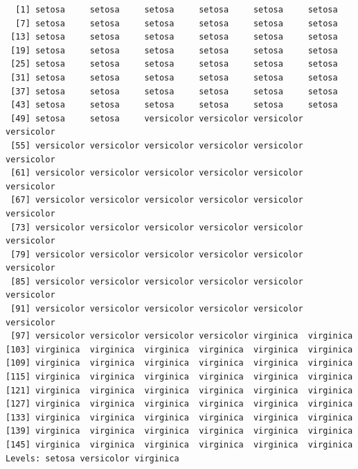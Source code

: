 \documentclass[
  letterpaper,
  DIV=11,
  numbers=noendperiod]{scrartcl}
\newenvironment{Shaded}{\begin{snugshade}}{\end{snugshade}}
\newcommand{\CommentTok}[1]{\textcolor[rgb]{0.37,0.37,0.37}{#1}}
\newcommand{\FunctionTok}[1]{\textcolor[rgb]{0.28,0.35,0.67}{#1}}
\newcommand{\NormalTok}[1]{\textcolor[rgb]{0.00,0.23,0.31}{#1}}
\newcommand{\OtherTok}[1]{\textcolor[rgb]{0.00,0.23,0.31}{#1}}
\newcommand{\SpecialCharTok}[1]{\textcolor[rgb]{0.37,0.37,0.37}{#1}}
\newcommand{\StringTok}[1]{\textcolor[rgb]{0.13,0.47,0.30}{#1}}
\begin{document}
\begin{verbatim}
  [1] setosa     setosa     setosa     setosa     setosa     setosa    
  [7] setosa     setosa     setosa     setosa     setosa     setosa    
 [13] setosa     setosa     setosa     setosa     setosa     setosa    
 [19] setosa     setosa     setosa     setosa     setosa     setosa    
 [25] setosa     setosa     setosa     setosa     setosa     setosa    
 [31] setosa     setosa     setosa     setosa     setosa     setosa    
 [37] setosa     setosa     setosa     setosa     setosa     setosa    
 [43] setosa     setosa     setosa     setosa     setosa     setosa    
 [49] setosa     setosa     versicolor versicolor versicolor versicolor
 [55] versicolor versicolor versicolor versicolor versicolor versicolor
 [61] versicolor versicolor versicolor versicolor versicolor versicolor
 [67] versicolor versicolor versicolor versicolor versicolor versicolor
 [73] versicolor versicolor versicolor versicolor versicolor versicolor
 [79] versicolor versicolor versicolor versicolor versicolor versicolor
 [85] versicolor versicolor versicolor versicolor versicolor versicolor
 [91] versicolor versicolor versicolor versicolor versicolor versicolor
 [97] versicolor versicolor versicolor versicolor virginica  virginica 
[103] virginica  virginica  virginica  virginica  virginica  virginica 
[109] virginica  virginica  virginica  virginica  virginica  virginica 
[115] virginica  virginica  virginica  virginica  virginica  virginica 
[121] virginica  virginica  virginica  virginica  virginica  virginica 
[127] virginica  virginica  virginica  virginica  virginica  virginica 
[133] virginica  virginica  virginica  virginica  virginica  virginica 
[139] virginica  virginica  virginica  virginica  virginica  virginica 
[145] virginica  virginica  virginica  virginica  virginica  virginica 
Levels: setosa versicolor virginica
\end{verbatim}

\begin{Shaded}
\end{Shaded}
\end{document}
